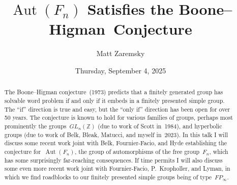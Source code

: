 \documentclass{UAmathtalk}
\author{Matt Zaremsky}
\title{$\operatorname{Aut}(F_n)$ Satisfies the Boone–Higman~Conjecture}
\date{Thursday, September 4, 2025}
\begin{document}
\maketitle

\begin{abstract}
The Boone–Higman conjecture~(1973) predicts that a finitely generated group has solvable word problem if and only if it embeds in a finitely presented simple group. The “if” direction is true and easy, but the “only if” direction has been open for over 50 years. The conjecture is known to hold for various families of groups, perhaps most prominently the groups~$GL_n(\mathbb{Z})$ (due to work of Scott in~1984), and hyperbolic groups (due to work of Belk, Bleak, Matucci, and myself in~2023). In this talk I will discuss some recent work joint with Belk, Fournier-Facio, and Hyde establishing the conjecture for~$\operatorname{Aut}(F_n)$, the group of automorphisms of the free group~$F_n$, which has some surprisingly far-reaching consequences. If time permits I will also discuss some even more recent work joint with Fournier-Facio, P.~Kropholler, and Lyman, in which we find roadblocks to our finitely presented simple groups being of type~$FP_\infty$.
\end{abstract}
\end{document}
